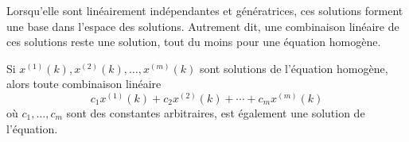                 Lorsqu'elle sont linéairement indépendantes et génératrices, ces solutions forment une base dans l'espace des solutions. Autrement dit, une combinaison linéaire de ces solutions reste une solution, tout du moins pour une équation homogène.
                \begin{theorem}
                    Si $x^{(1)}(k), x^{(2)}(k), \dots, x^{(m)}(k)$ sont solutions de l'équation homogène, alors toute combinaison linéaire
                    \begin{equation}
                        c_1 x^{(1)}(k)+c_2 x^{(2)}(k)+\cdots+c_m x^{(m)}(k)
                    \end{equation}
                    où $c_1, \dots, c_m$ sont des constantes arbitraires, est également une solution de l'équation.
                \end{theorem}
    

